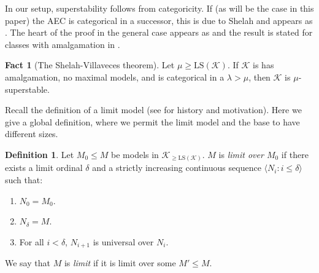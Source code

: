 \documentclass[12pt]{amsart}
\theoremstyle{definition}
\newtheorem{defin}[mydef]{Definition}
\newtheorem{fact}[mydef]{Fact}
\begin{document}
In our setup, superstability follows from categoricity. If (as will be the case in this paper) the AEC is categorical in a successor, this is due to Shelah and appears as \cite[Lemma 6.3]{sh394}. The heart of the proof in the general case appears as \cite[Theorem 2.2.1]{shvi635} and the result is stated for classes with amalgamation in \cite[Theorem 6.3]{gv-superstability-v2}.

\begin{fact}[The Shelah-Villaveces theorem]\label{shvi} 
  Let $\mu \ge {\text{LS}} ({\mathcal{K}})$. If ${\mathcal{K}}$ is has amalgamation, no maximal models, and is categorical in a $\lambda > \mu$, then ${\mathcal{K}}$ is $\mu$-superstable.
\end{fact}

Recall the definition of a limit model (see \cite{gvv-toappear-v1_2} for history and motivation). Here we give a global definition, where we permit the limit model and the base to have different sizes.

\begin{defin}\label{limit-def}
  Let $M_0 {\le} M$ be models in ${\mathcal{K}}_{\ge {\text{LS}} ({\mathcal{K}})}$. $M$ is \emph{limit over $M_0$} if there exists a limit ordinal $\delta$ and a strictly increasing continuous sequence ${\langle {N_i : i \le \delta} \rangle}$ such that:

  \begin{enumerate}
    \item $N_0 = M_0$.
    \item $N_\delta = M$.
    \item For all $i < \delta$, $N_{i + 1}$ is universal over $N_i$.
  \end{enumerate}

  We say that $M$ is \emph{limit} if it is limit over some $M' {\le} M$.
\end{defin}
\end{document}

